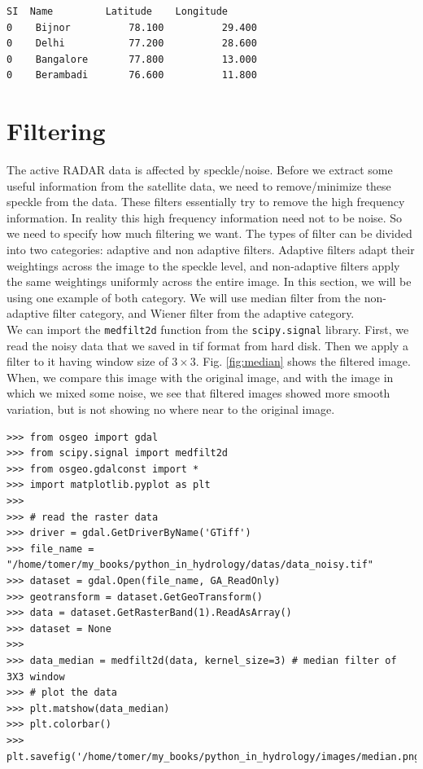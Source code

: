\documentclass[10pt]{book}
\begin{document}
{\begin{verbatim}
SI 	Name       	 Latitude 	 Longitude
0 	 Bijnor     	 78.100 	 	 29.400
0 	 Delhi      	 77.200 	 	 28.600
0 	 Bangalore  	 77.800 	 	 13.000
0 	 Berambadi  	 76.600 	 	 11.800
\end{verbatim}
\afterverb

\section{Filtering}
The active RADAR data is affected by speckle/noise. Before we extract some useful information from the satellite data, we need to remove/minimize these speckle from the data. These filters essentially try to remove the high frequency information. In reality this high frequency information need not to be noise. So we need to specify how much filtering we want. The types of filter can be divided into two categories: adaptive and non adaptive filters. Adaptive filters adapt their weightings across the image to the speckle level, and non-adaptive filters apply the same weightings uniformly across the entire image. In this section, we will be using one example of both category. We will use median filter from the non-adaptive filter category, and Wiener filter from the adaptive category. \\

We can import the \verb"medfilt2d" function from the \verb"scipy.signal" library. First, we read the noisy data that we saved in tif format from hard disk. Then we apply a filter to it having window size of $3\times3$. Fig. \ref{fig:median} shows the filtered image. When, we compare this image with the original image, and with the image in which we mixed some noise, we see that filtered images showed more smooth variation, but is not showing no where near to the original image. 
\beforeverb \begin{verbatim}
>>> from osgeo import gdal
>>> from scipy.signal import medfilt2d
>>> from osgeo.gdalconst import *
>>> import matplotlib.pyplot as plt
>>> 
>>> # read the raster data 
>>> driver = gdal.GetDriverByName('GTiff')
>>> file_name = "/home/tomer/my_books/python_in_hydrology/datas/data_noisy.tif"
>>> dataset = gdal.Open(file_name, GA_ReadOnly)
>>> geotransform = dataset.GetGeoTransform()
>>> data = dataset.GetRasterBand(1).ReadAsArray()
>>> dataset = None
>>> 
>>> data_median = medfilt2d(data, kernel_size=3) # median filter of 3X3 window
>>> # plot the data
>>> plt.matshow(data_median)
>>> plt.colorbar()
>>> plt.savefig('/home/tomer/my_books/python_in_hydrology/images/median.png')
\end{verbatim} \afterverb

}
\end{document}

